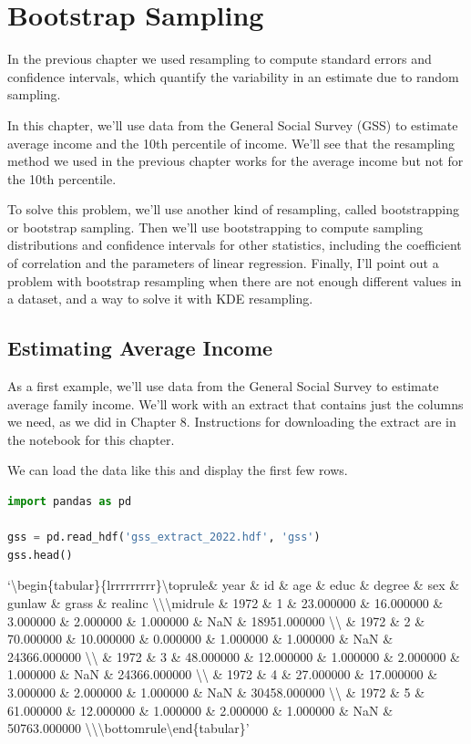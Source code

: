 \hypertarget{bootstrap-sampling}{%
\chapter{Bootstrap Sampling}\label{bootstrap-sampling}}

In the previous chapter we used resampling to compute standard errors
and confidence intervals, which quantify the variability in an estimate
due to random sampling.

In this chapter, we'll use data from the General Social Survey (GSS) to
estimate average income and the 10th percentile of income. We'll see
that the resampling method we used in the previous chapter works for the
average income but not for the 10th percentile.

To solve this problem, we'll use another kind of resampling, called
bootstrapping or bootstrap sampling. Then we'll use bootstrapping to
compute sampling distributions and confidence intervals for other
statistics, including the coefficient of correlation and the parameters
of linear regression. Finally, I'll point out a problem with bootstrap
resampling when there are not enough different values in a dataset, and
a way to solve it with KDE resampling.

\hypertarget{estimating-average-income}{%
\section{Estimating Average Income}\label{estimating-average-income}}

As a first example, we'll use data from the General Social Survey to
estimate average family income. We'll work with an extract that contains
just the columns we need, as we did in Chapter 8. Instructions for
downloading the extract are in the notebook for this chapter.

We can load the data like this and display the first few rows.

\begin{lstlisting}[language=Python,style=source]
import pandas as pd

gss = pd.read_hdf('gss_extract_2022.hdf', 'gss')
gss.head()
\end{lstlisting}

`\textbackslash begin\{tabular\}\{lrrrrrrrrr\}\n\textbackslash toprule\n \&
year \& id \& age \& educ \& degree \& sex \& gunlaw \& grass \& realinc
\textbackslash\textbackslash{}\n\textbackslash midrule \& 1972 \& 1
\& 23.000000 \& 16.000000 \& 3.000000 \& 2.000000 \& 1.000000 \& NaN \&
18951.000000 \textbackslash\textbackslash{} \& 1972 \& 2 \& 70.000000
\& 10.000000 \& 0.000000 \& 1.000000 \& 1.000000 \& NaN \& 24366.000000
\textbackslash\textbackslash{} \& 1972 \& 3 \& 48.000000 \& 12.000000
\& 1.000000 \& 2.000000 \& 1.000000 \& NaN \& 24366.000000
\textbackslash\textbackslash{} \& 1972 \& 4 \& 27.000000 \& 17.000000
\& 3.000000 \& 2.000000 \& 1.000000 \& NaN \& 30458.000000
\textbackslash\textbackslash{} \& 1972 \& 5 \& 61.000000 \& 12.000000
\& 1.000000 \& 2.000000 \& 1.000000 \& NaN \& 50763.000000
\textbackslash\textbackslash{}\n\textbackslash bottomrule\n\textbackslash end\{tabular\}\n'

